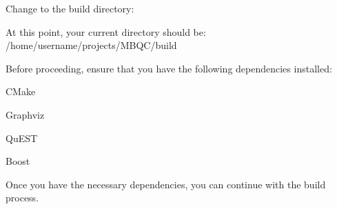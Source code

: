Change to the build directory\+: 
\begin{DoxyCode}{0}

\end{DoxyCode}


At this point, your current directory should be\+: {\ttfamily /home/username/projects/\+MBQC/build}

Before proceeding, ensure that you have the following dependencies installed\+:
\begin{DoxyItemize}
\item CMake
\item Graphviz
\item Qu\+EST
\item Boost
\end{DoxyItemize}

Once you have the necessary dependencies, you can continue with the build process. 